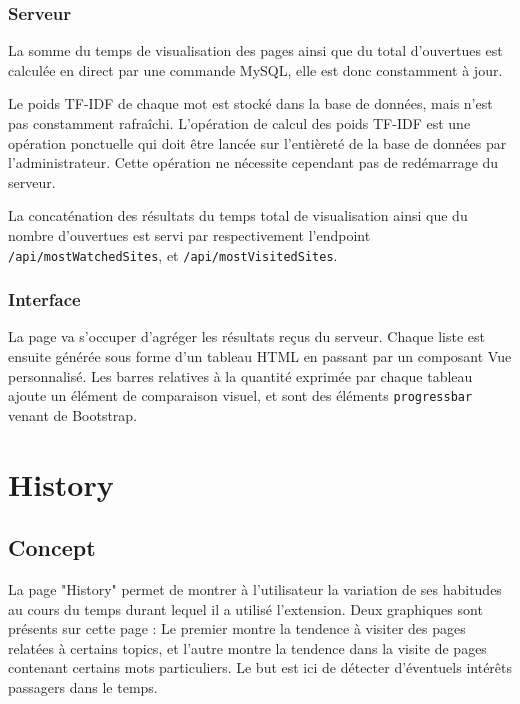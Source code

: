 		\subsubsection{Serveur}

			La somme du temps de visualisation des pages ainsi que du total d'ouvertues est calculée en direct par une commande MySQL, elle est donc constamment à jour.

			Le poids TF-IDF de chaque mot est stocké dans la base de données, mais n'est pas constamment rafraîchi. L'opération de calcul des poids TF-IDF est une opération ponctuelle qui doit être lancée sur l'entièreté de la base de données par l'administrateur. Cette opération ne nécessite cependant pas de redémarrage du serveur.

			La concaténation des résultats du temps total de visualisation ainsi que du nombre d'ouvertues est servi par respectivement l'endpoint \texttt{/api/mostWatchedSites}, et \texttt{/api/mostVisitedSites}.

		\subsubsection{Interface}

			La page va s'occuper d'agréger les résultats reçus du serveur. Chaque liste est ensuite générée sous forme d'un tableau HTML en passant par un composant Vue personnalisé. Les barres relatives à la quantité exprimée par chaque tableau ajoute un élément de comparaison visuel, et sont des éléments \texttt{progressbar} venant de Bootstrap.

\clearpage

%
%
%
%

\section{History}

	\subsection{Concept}

		La page "History" permet de montrer à l'utilisateur la variation de ses habitudes au cours du temps durant lequel il a utilisé l'extension. Deux graphiques sont présents sur cette page : Le premier montre la tendence à visiter des pages relatées à certains topics, et l'autre montre la tendence dans la visite de pages contenant certains mots particuliers. Le but est ici de détecter d'éventuels intérêts passagers dans le temps.

